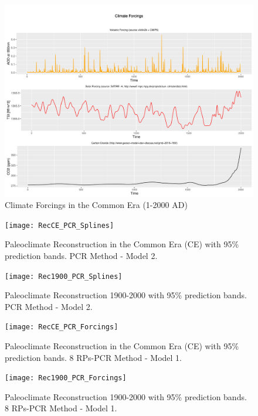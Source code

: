 \documentclass[11pt]{amsart}
\theoremstyle{plain}
\theoremstyle{definition}
\theoremstyle{remark}
\begin{document}

\begin{figure}[H]
  \centering
  \includegraphics[scale=0.35]{forcings}
  \caption{Climate Forcings in the Common Era (1-2000 AD)}
  \label{fig:forcings}
\end{figure}

\begin{figure}[H]
  \centering
  \texttt{[image: RecCE\_PCR\_Splines]}
  \caption{Paleoclimate Reconstruction in the Common Era (CE) with 95\%
    prediction bands. PCR Method - Model 2.}
  \label{fig:paleoCE3}
\end{figure}

\begin{figure}[H]
  \centering
  \texttt{[image: Rec1900\_PCR\_Splines]}
  \caption{Paleoclimate Reconstruction 1900-2000 with 95\%
    prediction bands. PCR Method - Model 2.}
  \label{fig:paleo19003}
\end{figure}

\begin{figure}[H]
  \centering
  \texttt{[image: RecCE\_PCR\_Forcings]}
  \caption{Paleoclimate Reconstruction in the Common Era (CE) with 95\%
    prediction bands. 8 RPs-PCR Method - Model 1.}
  \label{fig:paleoCE4}
\end{figure}

\begin{figure}[H]
  \centering
  \texttt{[image: Rec1900\_PCR\_Forcings]}
  \caption{Paleoclimate Reconstruction 1900-2000 with 95\%
    prediction bands. 8 RPs-PCR Method - Model 1.}
  \label{fig:paleo19004}
\end{figure}
\end{document}
